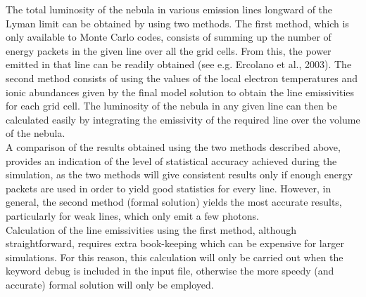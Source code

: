 \documentclass[11pt]{article}
\begin{document}
   The total luminosity of the nebula in various emission lines longward of the 
   Lyman limit can be obtained by using two methods. The first method, which is 
   only available to Monte Carlo codes, consists of summing up the number of energy
   packets in the given line over all the grid cells. From this, the power 
   emitted in that line can be readily obtained (see e.g. Ercolano et al., 2003). 
   The second method consists of using the values of the local electron temperatures
   and ionic abundances given by the final model solution to obtain the line 
   emissivities for each grid cell. The luminosity of the nebula in any given line 
   can then be calculated easily by integrating the emissivity of the required line
   over the volume of the nebula. \\
   A comparison of the results obtained using the two methods described above, 
   provides an indication of the level of statistical accuracy achieved during the 
   simulation, as the two methods will give consistent results only if enough 
   energy packets are used in order to yield good statistics for every line. 
   However, in general, the second method (formal solution) yields the most 
   accurate results, particularly for weak lines, which only emit a few photons.\\
   Calculation of the line emissivities using the first method, although 
   straightforward, requires extra book-keeping which can be expensive for larger 
   simulations. For this reason, this calculation will only be carried out when the
   keyword debug is included in the input file, otherwise the more speedy 
   (and accurate) formal solution will only be employed. \\

\\
   
\end{document}

